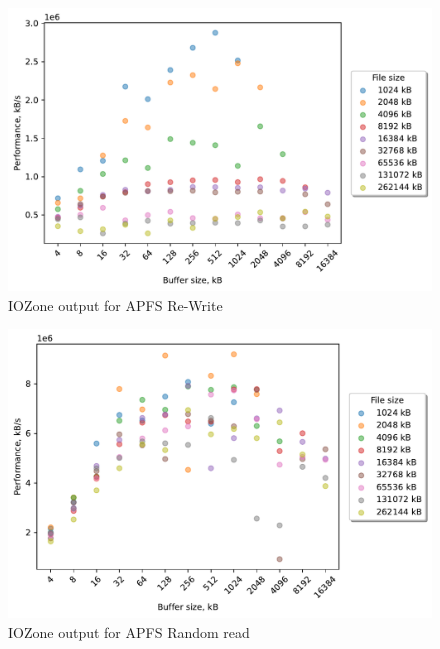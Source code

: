 \begin{figure}[!htb]
	\label{fig:bench_apfs_re_write}
	\begin{center}
		\includegraphics[width=1.0\textwidth]{figures.nosync/benchmarking/local/Re-Write.pdf}
	\end{center}
	\caption{IOZone output for \gls{APFS} \mbox{Re-Write}}
\end{figure}

\begin{figure}[!htb]
	\label{fig:bench_apfs_rnd_read}
	\begin{center}
		\includegraphics[width=1.0\textwidth]{figures.nosync/benchmarking/local/Random read.pdf}
	\end{center}
	\caption{IOZone output for \gls{APFS} Random read}
\end{figure}

